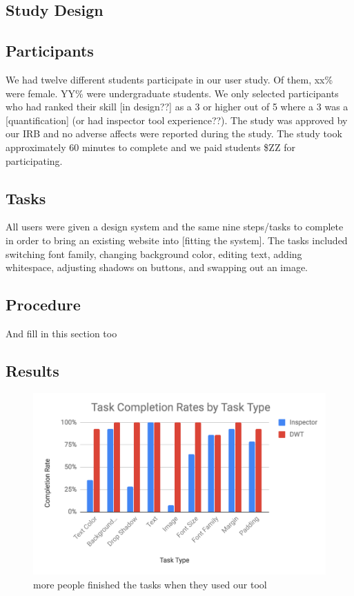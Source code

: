 \documentclass{sigchi}
\begin{document}
\subsection{Study Design}

\subsection{Participants}
We had twelve different students participate in our user study. Of them, xx\% were female. YY\% were undergraduate students. We only selected participants who had ranked their skill [in design??] as a 3 or higher out of 5 where a 3 was a [quantification] (or had inspector tool experience??). The study was approved by our IRB and no adverse affects were reported during the study. The study took approximately 60 minutes to complete and we paid students \$ZZ for participating. 


\subsection{Tasks}
All users were given a design system and the same nine steps/tasks to complete in order to bring an existing website into [fitting the system]. The tasks included switching font family, changing background color, editing text, adding whitespace, adjusting shadows on buttons, and swapping out an image. 


\subsection{Procedure}
And fill in this section too

\subsection{Results}
\begin{figure}
    \centering
    \includegraphics[width=\columnwidth]{real_figures/completition_rates.PNG}
    \caption{more people finished the tasks when they used our tool}  
    \label{fig:xray_screenshot}
\end{figure}
\end{document}
